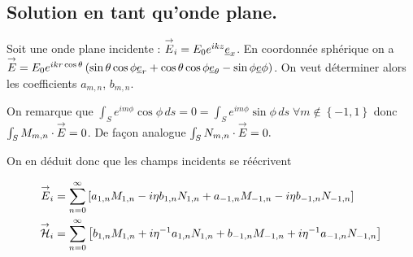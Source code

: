 \subsection{Solution en tant qu'onde plane.}

Soit une onde plane incidente : ${\overset{\rightarrow}{E}}_i = E_0 e^{ikz}\underline{e}_x$. En coordonnée sphérique on a ${\overset{\rightarrow}{E}} = E_0e^{ikr\cos\theta}\left(\sin\theta\cos\phi\underline{e}_r + \cos\theta\cos\phi\underline{e}_\theta - \sin\phi \underline{e} \phi\right)$. On veut déterminer alors les coefficients $a_{m,n}$, $b_{m,n}$.

On remarque que $\int_S e^{im\phi} \cos\phi \, ds = 0 = \int_S e^{im\phi} \sin\phi \,ds\; \forall m \not \in \left\lbrace -1,1 \right\rbrace$ donc $\int_S M_{m,n} \cdot {\overset{\rightarrow}{E}} = 0$. De façon analogue $\int_S N_{m,n} \cdot {\overset{\rightarrow}{E}} = 0.$

On en déduit donc que les champs incidents se réécrivent

\begin{align*}
    {\overset{\rightarrow}{E}}_i &= \sum\limits_{n=0}^\infty\left[ 
    a_{1,n}  M_{1,n} - i \eta b_{1,n} N_{1,n}
    + a_{-1,n}  M_{-1,n} - i \eta b_{-1,n} N_{-1,n}
    \right]\\
    {\overset{\rightarrow}{\mathcal{H}}}_i &= \sum\limits_{n=0}^\infty\left[
    b_{1,n}  M_{1,n} + i {\eta}^{-1} a_{1,n} N_{1,n}
    + b_{-1,n}  M_{-1,n} + i {\eta}^{-1} a_{-1,n} N_{-1,n}
    \right]
\end{align*}






